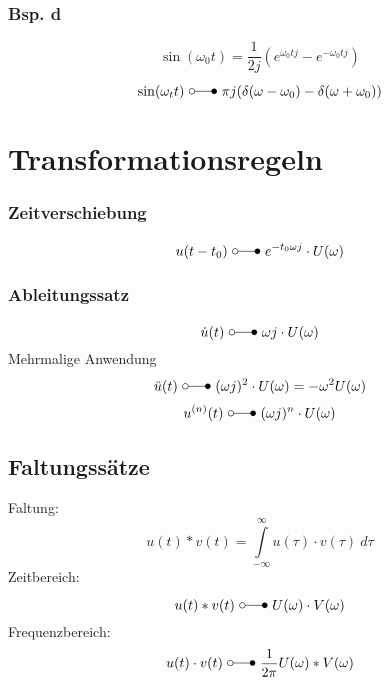\subsubsection{Bsp. d}
\[ \sin(\omega_0 t) = \frac{1}{2 j} (e^{\omega_0 t j} - e^{-\omega_0 t j}) \]
\[ \sin(\omega_t t) ~ \laplace 
~ \pi j (\delta(\omega - \omega_0) - \delta(\omega + \omega_0)) \]

\section{Transformationsregeln}
\subsubsection{Zeitverschiebung}
\[ u(t - t_0) ~ \laplace ~ e^{-t_0 \omega j} \cdot U(\omega) \]
\subsubsection{Ableitungssatz}
\[ \dot{u}(t) ~ \laplace ~ \omega j \cdot U(\omega) \]
Mehrmalige Anwendung
\[ \ddot{u}(t) ~ \laplace ~ (\omega j)^2 \cdot U(\omega) = -\omega^2 U(\omega) \]
\[ u^{(n)}(t) ~ \laplace ~ (\omega j)^n \cdot U(\omega) \]
\subsection{Faltungssätze}
Faltung: 
\[u(t) * v(t) = \int\limits_{-\infty}^{\infty} u(\tau) \cdot v(\tau) ~ d \tau  \]
Zeitbereich: 
\[ u(t) * v(t) ~ \laplace ~ U(\omega) \cdot V(\omega) \]
Frequenzbereich:
\[ u(t) \cdot v(t) ~ \laplace ~ \frac{1}{2 \pi} U(\omega) * V(\omega) \]
